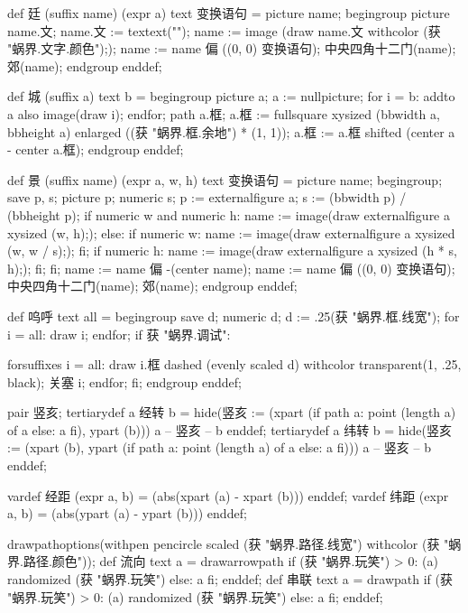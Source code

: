 \startMPinclusions[+]
def 廷 (suffix name) (expr a) text 变换语句 =
  picture name;
  begingroup
    picture name.文; name.文 := textext("");
    name := image (draw name.文 withcolor (获 "蜗界.文字.颜色"););
    name := name 偏 ((0, 0) 变换语句); 
    中央四角十二门(name); 郊(name);
  endgroup
enddef;
\stopMPinclusions

\startMPinclusions[+]
def 城 (suffix a) text b =
  begingroup
    picture a; a := nullpicture;
    for i = b: addto a also image(draw i); endfor;
    path a.框; a.框 := fullsquare xysized (bbwidth a, bbheight a) 
                                 enlarged ((获 "蜗界.框.余地") * (1, 1));
    a.框 := a.框 shifted (center a - center a.框);
  endgroup
enddef;
\stopMPinclusions

\startMPinclusions[+]
def 景 (suffix name) (expr a, w, h) text 变换语句 =
  picture name;
  begingroup;
  save p, s; picture p; numeric s;
  p := externalfigure a;
  s := (bbwidth p) / (bbheight p);
  if numeric w and numeric h:
    name := image(draw externalfigure a xysized (w, h););
  else:
    if numeric w:
      name := image(draw externalfigure a xysized (w, w / s););
    fi;
    if numeric h:
       name := image(draw externalfigure a xysized (h * s, h););
    fi;
  fi;
  name := name 偏 -(center name); %
  name := name 偏 ((0, 0) 变换语句); 
  中央四角十二门(name); 郊(name);
  endgroup
enddef;

def 呜呼 text all =
  begingroup
    save d; numeric d; d := .25(获 "蜗界.框.线宽");
    for i = all: 
      draw i; 
    endfor;
    if 获 "蜗界.调试":
      
      forsuffixes i = all: 
        draw i.框 dashed (evenly scaled d) withcolor transparent(1, .25, black);
        关塞 i; 
      endfor;
    fi;
  endgroup
enddef;
\stopMPinclusions

\startMPinclusions[+]
pair 竖亥;
tertiarydef a 经转 b =
  hide(竖亥 := (xpart (if path a: point (length a) of a else: a fi), ypart (b)))
  a -- 竖亥 -- b
enddef;
tertiarydef a 纬转 b =
  hide(竖亥 := (xpart (b), ypart (if path a: point (length a) of a else: a fi)))
  a --  竖亥 -- b
enddef;
\stopMPinclusions

\startMPinclusions[+]
vardef 经距 (expr a, b) = (abs(xpart (a) - xpart (b))) enddef;
vardef 纬距 (expr a, b) = (abs(ypart (a) - ypart (b))) enddef;
\stopMPinclusions

\startMPinclusions[+]
drawpathoptions(withpen pencircle scaled (获 "蜗界.路径.线宽") withcolor (获 "蜗界.路径.颜色"));
def 流向 text a =
  drawarrowpath if (获 "蜗界.玩笑") > 0: (a) randomized (获 "蜗界.玩笑") else: a fi;
enddef;
def 串联 text a =
  drawpath if (获 "蜗界.玩笑") > 0: (a) randomized (获 "蜗界.玩笑") else: a fi;  
enddef;
\stopMPinclusions

